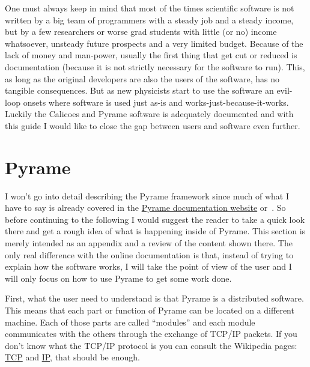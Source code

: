 One must always keep in mind that most of the times scientific
software is not written by a big team of programmers with a steady job
and a steady income, but by a few researchers or worse grad students
with little (or no) income whatsoever, unsteady future prospects and a
very limited budget. Because of the lack of money and man-power,
usually the first thing that get cut or reduced is documentation
(because it is not strictly necessary for the software to run). This,
as long as the original developers are also the users of the software,
has no tangible consequences. But as new physicists start to use the
software an evil-loop onsets where software is used just as-is and
works-just-because-it-works. Luckily the Calicoes and Pyrame software
is adequately documented and with this guide I would like to close the
gap between users and software even further.

\section{Pyrame}
I won't go into detail describing the Pyrame framework since much of
what I have to say is already covered in the
\href{http://llr.in2p3.fr/sites/pyrame/documentation/}{Pyrame
  documentation website} or~\cite{Rubio-Roy:2015}. So before
continuing to the following I would suggest the reader to take a quick
look there and get a rough idea of what is happening inside of
Pyrame. This section is merely intended as an appendix and a review of
the content shown there. The only real difference with the online
documentation is that, instead of trying to explain how the software
works, I will take the point of view of the user and I will only focus
on how to use Pyrame to get some work done.

First, what the user need to understand is that Pyrame is a
distributed software. This means that each part or function of Pyrame
can be located on a different machine. Each of those parts are called
``modules'' and each module communicates with the others through the
exchange of TCP/IP packets. If you don't know what the TCP/IP protocol
is you can consult the Wikipedia pages:
\href{https://en.wikipedia.org/wiki/Transmission_Control_Protocol}{TCP}
and \href{https://en.wikipedia.org/wiki/IPv4}{IP}, that should be
enough.

